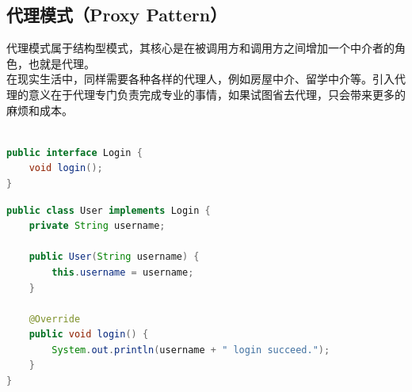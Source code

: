 \subsection{代理模式（Proxy Pattern）}

代理模式属于结构型模式，其核心是在被调用方和调用方之间增加一个中介者的角色，也就是代理。\\

在现实生活中，同样需要各种各样的代理人，例如房屋中介、留学中介等。引入代理的意义在于代理专门负责完成专业的事情，如果试图省去代理，只会带来更多的麻烦和成本。\\

\\

\begin{figure}[H]
    \centering
\end{figure}

\vspace{0.5cm}

\begin{lstlisting}[language=Java, title=Login.java]
public interface Login {
    void login();
}
\end{lstlisting}

\begin{lstlisting}[language=Java, title=User.java]
public class User implements Login {
    private String username;

    public User(String username) {
        this.username = username;
    }

    @Override
    public void login() {
        System.out.println(username + " login succeed.");
    }
}
\end{lstlisting}

